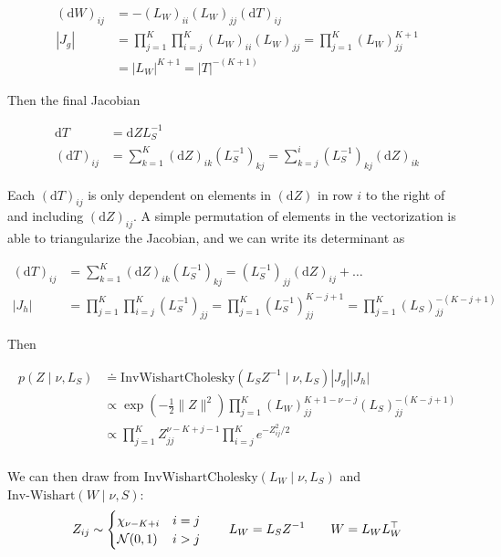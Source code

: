\documentclass{article}
\newcommand{\InvWish}{\text{Inv-Wishart}}
\begin{document}
\begin{align*}
    (\mathrm{d}W)_{ij} &= -(L_W)_{ii} (L_W)_{jj} (\mathrm{d}T)_{ij}\\
    |J_g| &= \prod_{j=1}^K \prod_{i=j}^K (L_W)_{ii} (L_W)_{jj} = \prod_{j=1}^K (L_W)_{jj}^{K+1} \\
    &= |L_W|^{K+1} = |T|^{-(K+1)}
\end{align*}


Then the final Jacobian

\begin{align*}
    \mathrm{d}T &= \mathrm{d}Z L_S^{-1}\\
    (\mathrm{d}T)_{ij} &= \sum_{k=1}^K (\mathrm{d}Z)_{ik} (L_S^{-1})_{kj} = \sum_{k=j}^i (L_S^{-1})_{kj} (\mathrm{d}Z)_{ik}
\end{align*}

Each $(\mathrm{d}T)_{ij}$ is only dependent on elements in $(\mathrm{d}Z)$ in row $i$ to the right of and including $(\mathrm{d}Z)_{ij}$.
A simple permutation of elements in the vectorization is able to triangularize the Jacobian, and we can write its determinant as

\begin{align*}
    (\mathrm{d}T)_{ij} &= \sum_{k=1}^K (\mathrm{d}Z)_{ik} (L_S^{-1})_{kj} = (L_S^{-1})_{jj} (\mathrm{d}Z)_{ij} + \ldots\\
    |J_h| &= \prod_{j=1}^K \prod_{i=j}^K (L_S^{-1})_{jj} = \prod_{j=1}^K (L_S^{-1})_{jj}^{K-j+1} = \prod_{j=1}^K (L_S)_{jj}^{-(K-j+1)}
\end{align*}


Then

\begin{align*}
    p(Z \mid \nu, L_S) &\doteq \mathrm{InvWishartCholesky}(L_S Z^{-1} \mid \nu, L_S) |J_g| |J_h|\\
    &\propto \exp\left(-\frac{1}{2}\lVert Z\rVert^2\right) \prod_{j=1}^K (L_W)_{jj}^{K + 1 - \nu - j} (L_S)_{jj}^{-(K-j+1)}\\
    &\propto \prod_{j=1}^K Z_{jj}^{\nu-K + j - 1} \prod_{i=j}^K e^{-Z_{ij}^2/2}\\
\end{align*}

We can then draw from $\mathrm{InvWishartCholesky}(L_W \mid \nu, L_S)$ and $\InvWish(W \mid \nu, S)$:
\[
    Z_{ij} \sim \begin{cases} \chi_{\nu-K+i} & i = j\\ \mathcal{N}(0, 1) & i > j \end{cases} \qquad L_W = L_S Z^{-1} \qquad W = L_W L_W^\top\\
\]
\end{document}
